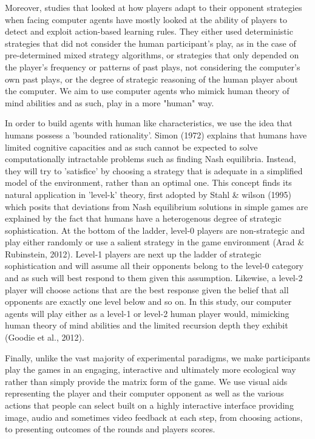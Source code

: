 \documentclass[12pt]{article}         %
\begin{document}
Moreover, studies that looked at how players adapt to their opponent strategies when facing computer agents have mostly looked at the ability of players to detect and exploit action-based learning rules. They either used deterministic strategies that did not consider the human participant's play, as in the case of pre-determined mixed strategy algorithms, or strategies that only depended on the player's frequency or patterns of past plays, not considering the computer's own past plays, or the degree of strategic reasoning of the human player about the computer. We aim to use computer agents who mimick human theory of mind abilities and as such, play in a more "human" way.  


In order to build agents with human like characteristics, we use the idea that humans possess a 'bounded rationality'. Simon (1972) explains that humans have limited cognitive capacities and as such cannot be expected to solve computationally intractable problems such as finding Nash equilibria. Instead, they will try to 'satisfice' by choosing a strategy that is adequate in a simplified model of the environment, rather than an optimal one. This concept finds its natural application in 'level-k' theory, first adopted by Stahl & wilson (1995) which posits that deviations from Nash equilibrium solutions in simple games are explained by the fact that humans have a heterogenous degree of strategic sophistication. At the bottom of the ladder, level-0 players are non-strategic and play either randomly or use a salient strategy in the game environment (Arad & Rubinstein, 2012). Level-1 players are next up the ladder of strategic sophistication and will assume all their opponents belong to the level-0 category and as such will best respond to them given this assumption. Likewise, a level-2 player will choose actions that are the best response given the belief that all opponents are exactly one level below and so on. 
In this study, our computer agents will play either as a level-1 or level-2 human player would, mimicking human theory of mind abilities and the limited recursion depth they exhibit (Goodie et al., 2012).  


Finally, unlike the vast majority of experimental paradigms, we make participants play the games in an engaging, interactive and ultimately more ecological way rather than simply provide the matrix form of the game. We use visual aids representing the player and their computer opponent as well as the various actions that people can select built on a highly interactive interface providing image, audio and sometimes video feedback at each step, from choosing actions, to presenting outcomes of the rounds and players scores.  
\end{document}
